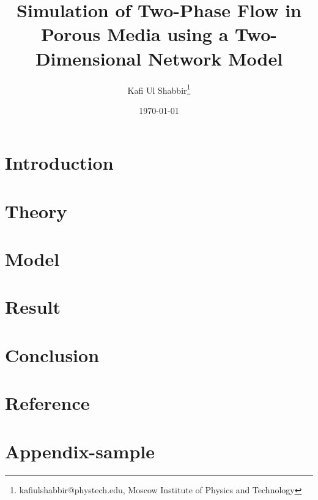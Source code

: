\documentclass[12pt]{report}
\title{Simulation of Two-Phase Flow in Porous Media using a Two-Dimensional Network Model}
\author{Kafi Ul Shabbir\thanks{kafiulshabbir@phystech.edu, Moscow Institute of Physics and Technology}}
\date{\today}
\begin{document}
	\maketitle

	\tableofcontents

	\chapter{Introduction}
		
		
	\chapter{Theory}
		
		
	\chapter{Model}
		

	\chapter{Result}
		

	\chapter{Conclusion}
		

	\chapter{Reference}
		
		
	\chapter{Appendix-sample}
		
\end{document}
